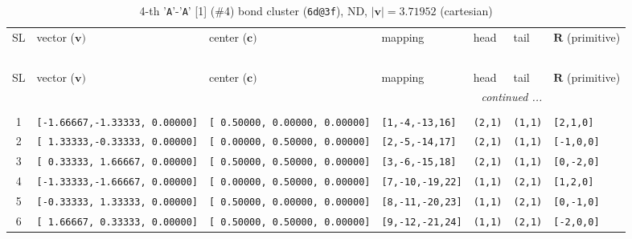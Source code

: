 \documentclass[fleqn,10pt,landscape]{jsarticle}
\begin{document}
\begin{longtable}[l]{cllllll}
\captionsetup{justification=raggedright, singlelinecheck=off}
\caption{4-th '\texttt{A}'-'\texttt{A}' [1] (\#4) bond cluster (\texttt{6d@3f}), ND, $|\bm{v}|=3.71952$ (cartesian)}
 \\
 \hline \hline
SL & vector ($\bm{v})$ & center ($\bm{c})$ & mapping & head & tail & $\bm{R}$ (primitive) \\ \hline \endfirsthead

\multicolumn{6}{l}{\tablename\ \thetable{}} \\
 \hline \hline
SL & vector ($\bm{v})$ & center ($\bm{c})$ & mapping & head & tail & $\bm{R}$ (primitive) \\ \hline \endhead

 \hline \hline
\multicolumn{6}{r}{\footnotesize\it continued ...} \\ \endfoot

 \hline \hline
\multicolumn{6}{r}{} \\ \endlastfoot

1 & \texttt{[-1.66667,-1.33333, 0.00000]} & \texttt{[ 0.50000, 0.00000, 0.00000]} & \texttt{[1,-4,-13,16]} & \texttt{(2,1)} & \texttt{(1,1)} & \texttt{[2,1,0]} \\ \hline
2 & \texttt{[ 1.33333,-0.33333, 0.00000]} & \texttt{[ 0.00000, 0.50000, 0.00000]} & \texttt{[2,-5,-14,17]} & \texttt{(2,1)} & \texttt{(1,1)} & \texttt{[-1,0,0]} \\ \hline
3 & \texttt{[ 0.33333, 1.66667, 0.00000]} & \texttt{[ 0.50000, 0.50000, 0.00000]} & \texttt{[3,-6,-15,18]} & \texttt{(2,1)} & \texttt{(1,1)} & \texttt{[0,-2,0]} \\ \hline
4 & \texttt{[-1.33333,-1.66667, 0.00000]} & \texttt{[ 0.00000, 0.50000, 0.00000]} & \texttt{[7,-10,-19,22]} & \texttt{(1,1)} & \texttt{(2,1)} & \texttt{[1,2,0]} \\ \hline
5 & \texttt{[-0.33333, 1.33333, 0.00000]} & \texttt{[ 0.50000, 0.00000, 0.00000]} & \texttt{[8,-11,-20,23]} & \texttt{(1,1)} & \texttt{(2,1)} & \texttt{[0,-1,0]} \\ \hline
6 & \texttt{[ 1.66667, 0.33333, 0.00000]} & \texttt{[ 0.50000, 0.50000, 0.00000]} & \texttt{[9,-12,-21,24]} & \texttt{(1,1)} & \texttt{(2,1)} & \texttt{[-2,0,0]} \\
\end{longtable}
\renewcommand{\arraystretch}{1.6}
\end{document}
